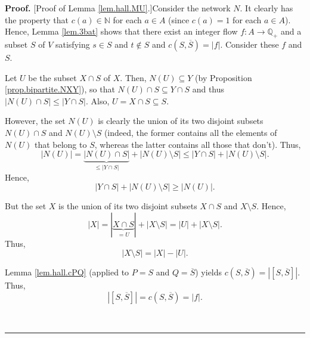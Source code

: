 \documentclass[numbers=enddot,12pt,final,onecolumn,notitlepage]{scrartcl}%
\theoremstyle{definition}
\newenvironment{proof}[1][Proof]{\noindent\textbf{#1.} }{\ \rule{0.5em}{0.5em}}
\begin{document}
\begin{proof}
[Proof of Lemma \ref{lem.hall.MU}.]Consider the network $N$. It clearly has
the property that $c\left(  a\right)  \in\mathbb{N}$ for each $a\in A$ (since
$c\left(  a\right)  =1$ for each $a\in A$). Hence, Lemma \ref{lem.3bat} shows
that there exist an integer flow $f:A\rightarrow\mathbb{Q}_{+}$ and a subset
$S$ of $V$ satisfying $s\in S$ and $t\notin S$ and $c\left(  S,\overline
{S}\right)  =\left\vert f\right\vert $. Consider these $f$ and $S$.

Let $U$ be the subset $X\cap S$ of $X$. Then, $N\left(  U\right)  \subseteq Y$
(by Proposition \ref{prop.bipartite.NXY}), so that $N\left(  U\right)  \cap
S\subseteq Y\cap S$ and thus $\left\vert N\left(  U\right)  \cap S\right\vert
\leq\left\vert Y\cap S\right\vert $. Also, $U=X\cap S\subseteq S$.

However, the set $N\left(  U\right)  $ is clearly the union of its two
disjoint subsets $N\left(  U\right)  \cap S$ and $N\left(  U\right)  \setminus
S$ (indeed, the former contains all the elements of $N\left(  U\right)  $ that
belong to $S$, whereas the latter contains all those that don't). Thus,%
\[
\left\vert N\left(  U\right)  \right\vert =\underbrace{\left\vert N\left(
U\right)  \cap S\right\vert }_{\leq\left\vert Y\cap S\right\vert }+\left\vert
N\left(  U\right)  \setminus S\right\vert \leq\left\vert Y\cap S\right\vert
+\left\vert N\left(  U\right)  \setminus S\right\vert .
\]
Hence,%
\begin{equation}
\left\vert Y\cap S\right\vert +\left\vert N\left(  U\right)  \setminus
S\right\vert \geq\left\vert N\left(  U\right)  \right\vert .
\label{pf.thm.hall.hard.3}%
\end{equation}


But the set $X$ is the union of its two disjoint subsets $X\cap S$ and
$X\setminus S$. Hence,
\[
\left\vert X\right\vert =\left\vert \underbrace{X\cap S}_{=U}\right\vert
+\left\vert X\setminus S\right\vert =\left\vert U\right\vert +\left\vert
X\setminus S\right\vert .
\]
Thus,%
\begin{equation}
\left\vert X\setminus S\right\vert =\left\vert X\right\vert -\left\vert
U\right\vert . \label{pf.thm.hall.hard.4}%
\end{equation}


Lemma \ref{lem.hall.cPQ} (applied to $P=S$ and $Q=\overline{S}$) yields
$c\left(  S,\overline{S}\right)  =\left\vert \left[  S,\overline{S}\right]
\right\vert $. Thus,
\begin{equation}
\left\vert \left[  S,\overline{S}\right]  \right\vert =c\left(  S,\overline
{S}\right)  =\left\vert f\right\vert . \label{pf.thm.hall.hard.5}%
\end{equation}



\end{proof}
\end{document}

